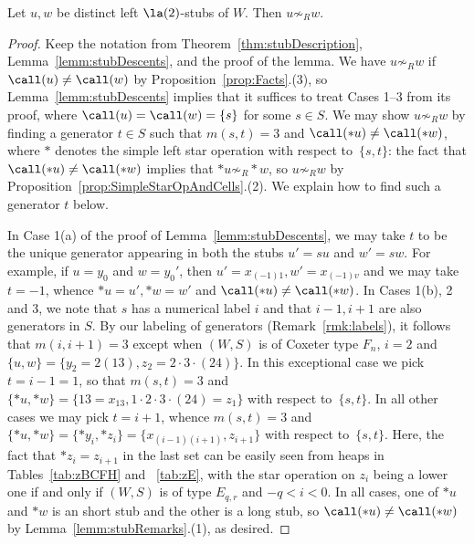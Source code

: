\begin{prop}
    \label{prop:distinctCells}
    Let $u,w$ be distinct left $\la(2)$-stubs of $W$. Then $u\not\sim_R w$. 
\end{prop}
\begin{proof}
    Keep the notation from Theorem~\ref{thm:stubDescription}, Lemma~\ref{lemm:stubDescents}, and the proof of
    the lemma.  We have $u\not\sim_R w$ if $\call(u)\neq \call(w)$ by Proposition~\ref{prop:Facts}.(3), so
    Lemma~\ref{lemm:stubDescents} implies that it suffices to treat Cases 1--3 from its proof, where
    $\call(u)=\call(w)=\{s\}$ for some $s\in S$. We may show $u\not\sim_R w$ by finding a generator
    $t\in S$ such that $m(s,t)=3$ and $\call(*u)\neq \call(*w)$, where $*$ denotes the simple left
    star operation with respect to~$\{s,t\}$: the fact that $\call(*u)\neq \call(*w)$ implies that
    $*u\not\sim_R *w$, so $u\not\sim_R w$ by Proposition~\ref{prop:SimpleStarOpAndCells}.(2). We explain how to
    find such a generator $t$ below.

    In Case 1(a) of the proof of Lemma~\ref{lemm:stubDescents}, we may take $t$ to be the unique
    generator appearing in both the stubs $u'=su$ and $w'=sw$.  For example, if $u=y_0$ and
    $w=y_0'$, then $u'= x_{(-1)1}, w'=x_{(-1)v}$ and we may take $t=-1$, whence $*u=u', *w=w'$ and
    $\call(*u)\neq \call(*w)$.  In Cases 1(b), 2 and 3, we note that $s$ has a numerical label $i$
    and that $i-1,i+1$ are also generators in $S$. By our labeling of generators
    (Remark~\ref{rmk:labels}), it follows that $m(i,i+1)=3$ except when $(W,S)$ is of Coxeter type $F_n$,
    $i=2$ and $\{u,w\}=\{y_2=2(13),z_2=2\cdot 3\cdot (24)\}$.  In this exceptional case we pick
    $t=i-1=1$, so that $m(s,t)=3$ and $\{*u,*w\}=\{13=x_{13},1\cdot 2\cdot 3\cdot (24)=z_1\}$ with
    respect to~$\{s,t\}$. In all other cases we may pick $t=i+1$, whence $m(s,t)=3$ and
    $\{*u,*w\}=\{*y_i,*z_i\}=\{x_{(i-1)(i+1)},z_{i+1}\}$ with respect to~$\{s,t\}$. Here, the fact
    that $*z_i=z_{i+1}$ in the last set can be easily seen from heaps in Tables~\ref{tab:zBCFH} and
   ~\ref{tab:zE}, with the star operation on $z_i$ being a lower one if and only if $(W,S)$ is of
    type $E_{q,r}$ and $-q<i<0$. In all cases, one of $*u$ and $*w$ is an short stub and the other
    is a long stub, so $\call(*u)\neq \call(*w)$ by Lemma~\ref{lemm:stubRemarks}.(1), as desired.
\end{proof}
